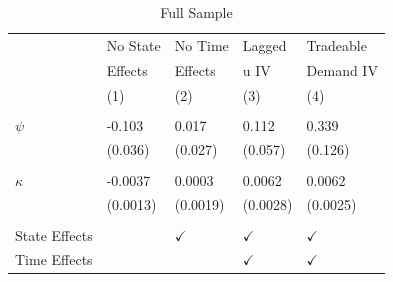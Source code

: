 \documentclass[10pt]{beamer}
\begin{document}
\begin{frame} \label{full_sample_estimates}
	\begin{table}[t]
		\centering 
		\small
		\caption{Full Sample} \vspace{-5pt}
		\begin{tabular}{p{2cm}P{1.9cm}P{1.9cm}P{1.9cm}P{1.9cm}} 
			\toprule\hline 
			& No State & No Time & Lagged & Tradeable \\
			& Effects & Effects & u IV & Demand IV \\
			\cmidrule(r){2-5}
			& (1) & (2) & (3) & (4) \\\midrule \\ [-2mm]
			
			
			$\psi$      &      -0.103   &       0.017   &       0.112   &       0.339  \\
			&     (0.036)   &     (0.027)   &     (0.057)   &     (0.126)   \\
			\\[-2mm]
			
			$\kappa$    &     -0.0037   &      0.0003   &      0.0062   &       0.0062   \\
			&    (0.0013)   &    (0.0019)   &    (0.0028)   &     (0.0025)   \\
			\\ [-2mm] \cmidrule(r){2-5}
			State Effects &  & $\checkmark$ & $\checkmark$ & $\checkmark$ \\
			Time Effects & & & $\checkmark$ & $\checkmark$ \\
			\bottomrule
		\end{tabular}
	\end{table}
\end{frame}
\end{document}
